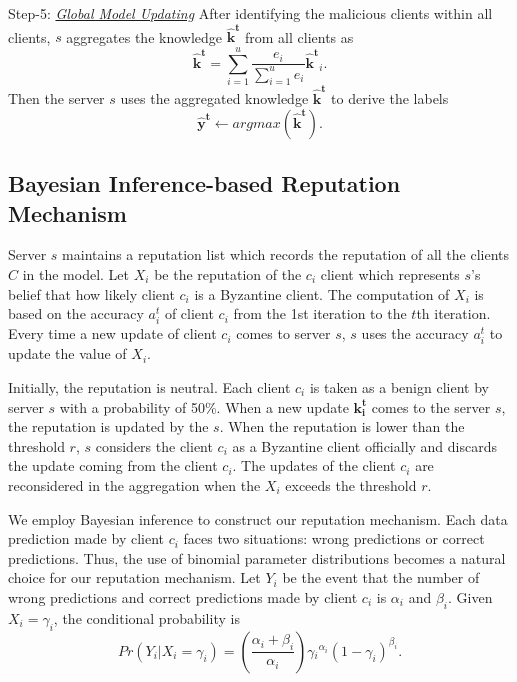 \documentclass[journal]{IEEEtran}
\begin{document}
  \par Step-5: \ul{\textit{Global Model Updating}} After identifying the malicious clients within all clients, $s$ aggregates the knowledge $\mathbf{\hat{k}^t}$ from all clients as
  \begin{equation}
    \mathbf{\hat{k}^t}=\sum_{i=1}^{u}\frac{e_i}{\sum_{i=1}^{u}e_i}\mathbf{\hat{k}^t}_i.
  \end{equation}
  Then the server $s$ uses the aggregated knowledge $\mathbf{\hat{k}^t}$ to derive the labels
  \begin{equation}
    \mathbf{\hat{y}^t}\gets argmax(\mathbf{\hat{k}^t}).
  \end{equation} 


  



\subsection{Bayesian Inference-based Reputation Mechanism}
Server $s$ maintains a reputation list which records the reputation of all the clients $C$ in the model. Let $X_i$ be the reputation of the $c_i$ client which represents $s$'s belief that how likely client $c_i$ is a Byzantine client. The computation of $X_i$ is based on the accuracy $a_i^t$ of client $c_i$ from the 1st iteration to the $t$th iteration. Every time a new update of client $c_i$ comes to server $s$, $s$ uses the accuracy $a_i^t$ to update the value of $X_i$.
\par Initially, the reputation is neutral. Each client $c_i$ is taken as a benign client by server $s$ with a probability of 50\%. When a new update $\mathbf{k_i^t}$ comes to the server $s$, the reputation is updated by the $s$. When the reputation is lower than the threshold $r$, $s$ considers the client $c_i$ as a Byzantine client officially and discards the update coming from the client $c_i$. The updates of the client $c_i$ are reconsidered in the aggregation when the $X_i$ exceeds the threshold $r$.
\par We employ Bayesian inference to construct our reputation mechanism. Each data prediction made by client $c_i$ faces two situations: wrong predictions or correct predictions. Thus, the use of binomial parameter distributions becomes a natural choice for our reputation mechanism. Let $Y_i$ be the event that the number of wrong predictions and correct predictions made by client $c_i$ is $\alpha_i$ and $\beta_i$. Given $X_i=\gamma_i$, the conditional probability is 
\begin{equation}
    Pr(Y_i|X_i=\gamma _i)=\left ( \frac{\alpha _i+\beta _i}{\alpha _i} \right )\gamma {_{i}}^{\alpha_i}\left ( 1-\gamma_{i} \right )^{\beta_{i}}\label{equation_1}.
\end{equation}
\end{document}
